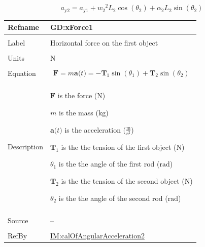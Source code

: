 \documentclass[12pt]{article}
\begin{document}
\begin{displaymath}
{a_{\text{y}2}}={a_{\text{y}1}}+{w_{2}}^{2} {L_{2}} \cos\left({θ_{2}}\right)+{α_{2}} {L_{2}} \sin\left({θ_{2}}\right)
\end{displaymath}
\vspace{\baselineskip}
\noindent
\begin{minipage}{\textwidth}
\begin{tabular}{>{\raggedright}p{}>{\raggedright\arraybackslash}p{}}
\toprule \textbf{Refname} & \textbf{GD:xForce1}
\label{GD:xForce1}
\\ \midrule \\
Label & Horizontal force on the first object
        
\\ \midrule \\
Units & ${\text{N}}$
        
\\ \midrule \\
Equation & \begin{displaymath}
           \symbf{F}=m \symbf{a}\text{(}t\text{)}=-{\symbf{T}_{1}} \sin\left({θ_{1}}\right)+{\symbf{T}_{2}} \sin\left({θ_{2}}\right)
           \end{displaymath}
\\ \midrule \\
Description & \begin{symbDescription}
              \item{$\symbf{F}$ is the force (${\text{N}}$)}
              \item{$m$ is the mass (${\text{kg}}$)}
              \item{$\symbf{a}\text{(}t\text{)}$ is the acceleration ($\frac{\text{m}}{\text{s}^{2}}$)}
              \item{${\symbf{T}_{1}}$ is the the tension of the first object (${\text{N}}$)}
              \item{${θ_{1}}$ is the the angle of the first rod (${\text{rad}}$)}
              \item{${\symbf{T}_{2}}$ is the the tension of the second object (${\text{N}}$)}
              \item{${θ_{2}}$ is the the angle of the second rod (${\text{rad}}$)}
              \end{symbDescription}
\\ \midrule \\
Source & --
         
\\ \midrule \\
RefBy & \hyperref[IM:calOfAngularAcceleration2]{IM:calOfAngularAcceleration2}
        
\\ \bottomrule
\end{tabular}
\end{minipage}
\end{document}
